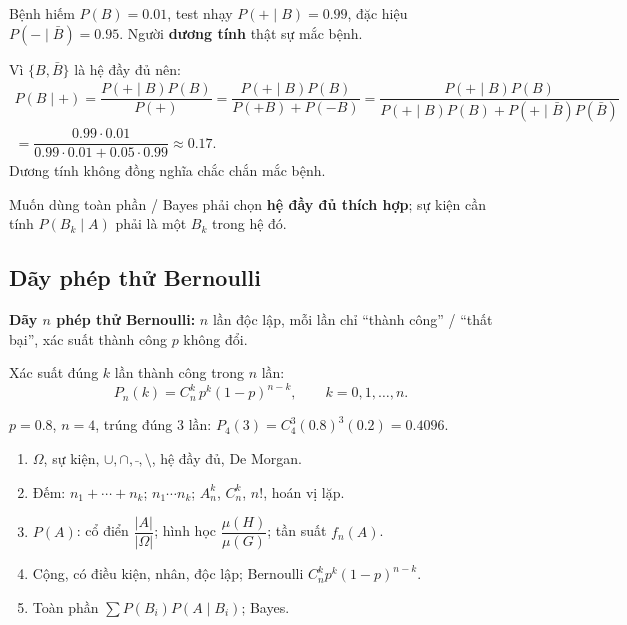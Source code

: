 \documentclass[12pt,a4paper]{article}
\begin{document}
\begin{ungdung}[title={Bayes trong chẩn đoán}]
Bệnh hiếm $P(B) = 0.01$, test nhạy $P(+ \mid B) = 0.99$, đặc hiệu $P(- \mid \bar{B}) = 0.95$. Người \textbf{dương tính} thật sự mắc bệnh.

Vì $\{B, \bar{B}\}$ là hệ đầy đủ nên:
\begin{align*}
  P(B \mid +) = \dfrac{P(+ \mid B) P(B)}{P(+)} = \dfrac{P(+ \mid B) P(B)}{P(+B)+P(-B)} = \dfrac{P(+ \mid B) P(B)}{P(+ \mid B) P(B) + P(+ \mid \bar{B}) P(\bar{B})} \\= \dfrac{0.99 \cdot 0.01}{0.99 \cdot 0.01 + 0.05 \cdot 0.99} \approx 0.17.
\end{align*}
Dương tính không đồng nghĩa chắc chắn mắc bệnh.
\end{ungdung}

\begin{luuy}
Muốn dùng toàn phần / Bayes phải chọn \textbf{hệ đầy đủ thích hợp}; sự kiện cần tính $P(B_k \mid A)$ phải là một $B_k$ trong hệ đó.
\end{luuy}

\subsection{Dãy phép thử Bernoulli}

\begin{dinhnghia}
  \textbf{Dãy $n$ phép thử Bernoulli:} $n$ lần độc lập, mỗi lần chỉ ``thành công'' / ``thất bại'', xác suất thành công $p$ không đổi.
\end{dinhnghia}

\begin{dinhnghia}[title={Công thức Bernoulli}]
Xác suất đúng $k$ lần thành công trong $n$ lần:
\[
  P_n(k) = C_n^k\, p^k (1-p)^{n-k}, \qquad k = 0, 1, \ldots, n.
\]
\end{dinhnghia}

\begin{vidu}[title={Bắn cung}]
$p = 0.8$, $n = 4$, trúng đúng $3$ lần: $P_4(3) = C_4^3 (0.8)^3 (0.2) = 0.4096$.
\end{vidu}

\begin{tongket}[title={Tổng kết}]
\begin{enumerate}
  \item $\Omega$, sự kiện, $\cup,\cap,\bar{\ },\setminus$, hệ đầy đủ, De Morgan.
  \item Đếm: $n_1 + \cdots + n_k$; $n_1 \cdots n_k$; $A_n^k$, $C_n^k$, $n!$, hoán vị lặp.
  \item $P(A)$: cổ điển $\dfrac{|A|}{|\Omega|}$; hình học $\dfrac{\mu(H)}{\mu(G)}$; tần suất $f_n(A)$.
  \item Cộng, có điều kiện, nhân, độc lập; Bernoulli $C_n^k p^k(1-p)^{n-k}$.
  \item Toàn phần $\displaystyle\sum P(B_i)P(A \mid B_i)$; Bayes.
\end{enumerate}

\end{tongket}
\end{document}
